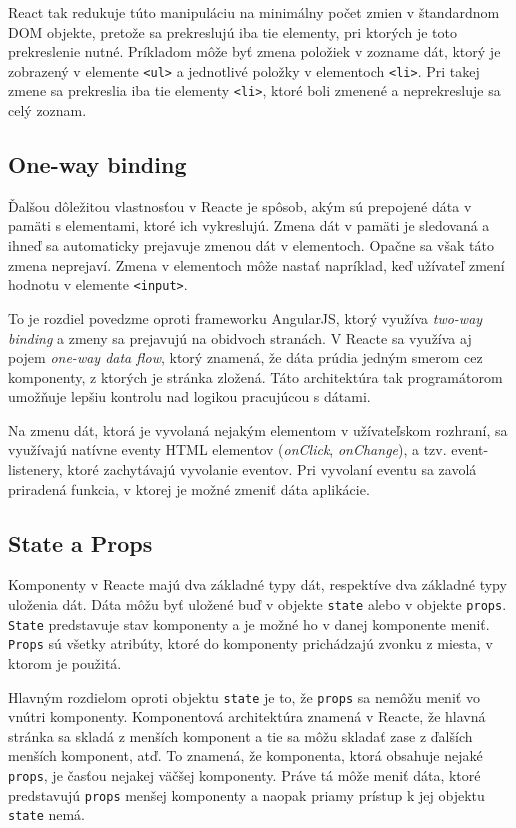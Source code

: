\documentclass[
  digital, %
  table,   %
  lof,     %
  lot,     %
]{fithesis3}
\begin{document}
React tak redukuje túto manipuláciu na minimálny počet zmien v štandardnom DOM objekte, pretože sa prekreslujú iba tie elementy, pri ktorých je toto prekreslenie nutné. Príkladom môže byť zmena položiek v zozname dát, ktorý je zobrazený v elemente \texttt{<ul>} a jednotlivé položky v elementoch \texttt{<li>}. Pri takej zmene sa prekreslia iba tie elementy \texttt{<li>}, ktoré boli zmenené a neprekresluje sa celý zoznam.

\subsection{One-way binding}
Ďalšou dôležitou vlastnosťou v Reacte je spôsob, akým sú prepojené dáta v pamäti s elementami, ktoré ich vykreslujú. Zmena dát v pamäti je sledovaná a ihneď sa automaticky prejavuje zmenou dát v elementoch. Opačne sa však táto zmena neprejaví. Zmena v elementoch môže nastať napríklad, keď užívateľ zmení hodnotu v elemente \texttt{<input>}.

To je rozdiel povedzme oproti frameworku AngularJS, ktorý využíva \textit{two-way binding} a zmeny sa prejavujú na obidvoch stranách. V Reacte sa využíva aj pojem \textit{one-way data flow}, ktorý znamená, že dáta prúdia jedným smerom cez komponenty, z ktorých je stránka zložená. Táto architektúra tak programátorom umožňuje lepšiu kontrolu nad logikou pracujúcou s dátami.

Na zmenu dát, ktorá je vyvolaná nejakým elementom v užívateľskom rozhraní, sa využívajú natívne eventy HTML elementov (\textit{onClick}, \textit{onChange}), a tzv. event-listenery, ktoré zachytávajú vyvolanie eventov. Pri vyvolaní eventu sa zavolá priradená funkcia, v ktorej je možné zmeniť dáta aplikácie.

\subsection{State a Props}
Komponenty v Reacte majú dva základné typy dát, respektíve dva základné typy uloženia dát. Dáta môžu byť uložené buď v objekte \texttt{state} alebo v objekte \texttt{props}. \texttt{State} predstavuje stav komponenty a je možné ho v danej komponente meniť. \texttt{Props} sú všetky atribúty, ktoré do komponenty prichádzajú zvonku z miesta, v ktorom je použitá.

Hlavným rozdielom oproti objektu \texttt{state} je to, že \texttt{props} sa nemôžu meniť vo vnútri komponenty. Komponentová architektúra znamená v Reacte, že hlavná stránka sa skladá z menších komponent a tie sa môžu skladať zase z ďalších menších komponent, atď. To znamená, že komponenta, ktorá obsahuje nejaké \texttt{props}, je časťou nejakej väčšej komponenty. Práve tá môže meniť dáta, ktoré predstavujú \texttt{props} menšej komponenty a naopak priamy prístup k jej objektu \texttt{state} nemá.
\end{document}
